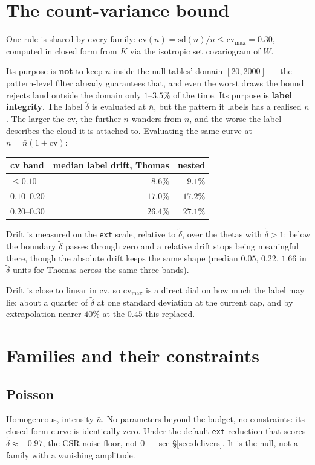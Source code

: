 \documentclass[11pt]{article}
\newcommand{\dt}{\tilde\delta}
\newcommand{\nb}{\bar n}
\newcommand{\cvmax}{\mathrm{cv}_{\max}}
\newcommand{\code}[1]{\texttt{#1}}
\begin{document}
\section{The count-variance bound}
One rule is shared by every family: $\mathrm{cv}(n)=\mathrm{sd}(n)/\nb \le \cvmax = 0.30$, computed in closed form from $K$ via the isotropic set covariogram of $W$.

Its purpose is \textbf{not} to keep $n$ inside the null tables' domain $[20,2000]$ --- the pattern-level filter already guarantees that, and even the worst draws the bound rejects land outside the domain only $1$--$3.5\%$ of the time. Its purpose is \textbf{label integrity}. The label $\dt$ is evaluated at $\nb$, but the pattern it labels has a realised $n$. The larger the cv, the further $n$ wanders from $\nb$, and the worse the label describes the cloud it is attached to. Evaluating the same curve at $n=\nb(1\pm\mathrm{cv})$:

\smallskip
\begin{tabular}{@{}lrr@{}}
\toprule
cv band & median label drift, Thomas & nested \\
\midrule
$\le0.10$    & $8.6\%$  & $9.1\%$ \\
$0.10$--$0.20$ & $17.0\%$ & $17.2\%$ \\
$0.20$--$0.30$ & $26.4\%$ & $27.1\%$ \\
\bottomrule
\end{tabular}

\smallskip
Drift is measured on the \code{ext} scale, relative to $\dt$, over the thetas with $\dt>1$: below the boundary $\dt$ passes through zero and a relative drift stops being meaningful there, though the absolute drift keeps the same shape (median $0.05$, $0.22$, $1.66$ in $\dt$ units for Thomas across the same three bands).

Drift is close to linear in cv, so $\cvmax$ is a direct dial on how much the label may lie: about a quarter of $\dt$ at one standard deviation at the current cap, and by extrapolation nearer $40\%$ at the $0.45$ this replaced.

\section{Families and their constraints}

\subsection*{Poisson}
Homogeneous, intensity $\nb$. No parameters beyond the budget, no constraints: its closed-form curve is identically zero. Under the default \code{ext} reduction that scores $\dt\approx-0.97$, the CSR noise floor, not $0$ --- see \S\ref{sec:delivers}. It is the null, not a family with a vanishing amplitude.
\end{document}
